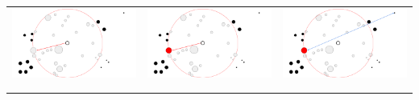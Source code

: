 \documentclass[]{article}
\begin{document}
\begin{table}
\begin{tabular}{c|c|c}
			\includegraphics[scale = 0.15]{images/RR4.png} & \includegraphics[scale = 0.15]{images/RR5.png} & \includegraphics[scale = 0.15]{images/RR6.png}\\
			\\ \hline \\

\end{tabular}
\end{table}
\end{document}
